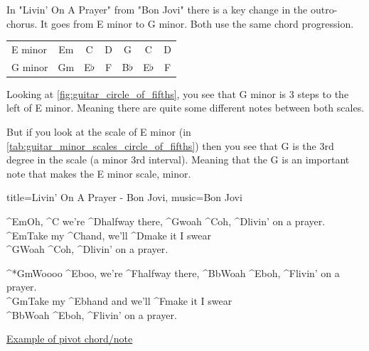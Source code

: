 In "Livin' On A Prayer" from "Bon Jovi" there is a key change in the outro-chorus. It goes from E minor to G minor. Both use the same chord progression.

\begin{table}[h]
	\centering
	\begin{NiceTabular}{|l|c|c|c|c|c|c|}
		\hline
		 &  &  &  &  &  &  \\
		\hline
		E minor & Em & C & D & G & C & D \\
		\hline
		G minor & Gm & E$\flat$ & F & B$\flat$ & E$\flat$ & F \\
		\hline
	\end{NiceTabular}
\end{table}

Looking at \autoref{fig:guitar_circle_of_fifths}, you see that G minor is 3 steps to the left of E minor. Meaning there are quite some different notes between both scales.

But if you look at the scale of E minor (in \autoref{tab:guitar_minor_scales_circle_of_fifths}) then you see that G is the 3rd degree in the scale (a minor 3rd interval). Meaning that the G is an important note that makes the E minor scale, minor.

\begin{song}[verse/numbered, align-chords=l]{title={Livin' On A Prayer - Bon Jovi}, music={Bon Jovi}}
	\begin{chorus}
		^{Em}Oh, ^{C} we're ^{D}halfway there, ^{G}woah ^{C}oh, ^{D}livin' on a prayer. \\
		^{Em}Take my ^{C}hand, we'll ^{D}make it I swear \\
		^{G}Woah ^{C}oh, ^{D}livin' on a prayer. \\
	\end{chorus}
	
	\begin{outro-chorus}
		^*{Gm}Woooo ^{Eb}oo, we're ^{F}halfway there, ^{Bb}Woah ^{Eb}oh, ^{F}livin' on a prayer. \\
		^{Gm}Take my ^{Eb}hand and we'll ^{F}make it I swear \\
		^{Bb}Woah ^{Eb}oh, ^{F}livin' on a prayer. \\
	\end{outro-chorus}
\end{song}

\newpage

\underline{Example of pivot chord/note}

